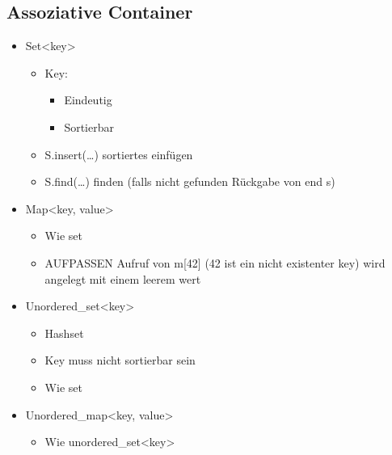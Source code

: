 \subsection{Assoziative Container}
\begin{itemize}
	\item Set<key>
	\begin{itemize}
		\item Key: 
		\begin{itemize}
			\item Eindeutig
			\item Sortierbar
		\end{itemize}
		\item S.insert(…)	sortiertes einfügen
		\item S.find(…)	finden (falls nicht gefunden Rückgabe von end s)
	\end{itemize}
	\item Map<key, value>
	\begin{itemize}
		\item Wie set
		\item AUFPASSEN Aufruf von m[42] (42 ist ein nicht existenter key) wird angelegt mit einem leerem wert
	\end{itemize}
	\item Unordered\_set<key>
	\begin{itemize}
		\item Hashset
		\item Key muss nicht sortierbar sein
		\item Wie set
	\end{itemize}
	\item Unordered\_map<key, value>
	\begin{itemize}
		\item Wie unordered\_set<key>
	\end{itemize}
\end{itemize}